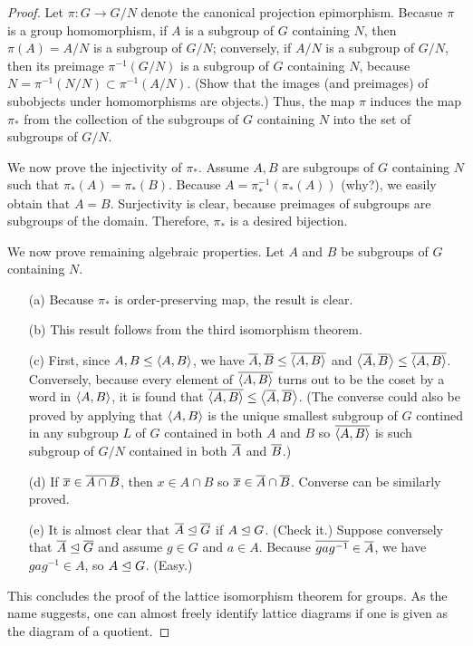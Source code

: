 \begin{proof}
    Let $\pi: G\rightarrow G/N$ denote the canonical projection epimorphism.
    Becasue $\pi$ is a group homomorphism, if $A$ is a subgroup of $G$ containing $N$, then $\pi(A)=A/N$ is a subgroup of $G/N$; conversely, if $A/N$ is a subgroup of $G/N$, then its preimage $\pi^{-1}(G/N)$ is a subgroup of $G$ containing $N$, because $N=\pi^{-1}(N/N)\subset\pi^{-1}(A/N)$.
    \color{brown}(Show that the images (and preimages) of subobjects under homomorphisms are objects.) \color{black}
    Thus, the map $\pi$ induces the map $\pi_*$ from the collection of the subgroups of $G$ containing $N$ into the set of subgroups of $G/N$.
    
    We now prove the injectivity of $\pi_*$.
    Assume $A, B$ are subgroups of $G$ containing $N$ such that $\pi_*(A)=\pi_*(B)$.
    Because $A=\pi_*^{-1}(\pi_*(A))$ \color{brown}(why?)\color{black}, we easily obtain that $A=B$.
    Surjectivity is clear, because preimages of subgroups are subgroups of the domain.
    Therefore, $\pi_*$ is a desired bijection.

    We now prove remaining algebraic properties.
    Let $A$ and $B$ be subgroups of $G$ containing $N$.
    \begin{enumerate}
        \item[(a)]
        {
            Because $\pi_*$ is order-preserving map, the result is clear.
        }
        \item[(b)]
        {
            This result follows from the third isomorphism theorem.
        }
        \item[(c)]
        {
            First, since $A, B\leq{\left\langle{A, B}\right\rangle}$, we have $\overline{A}, \overline{B}\leq\overline{{\left\langle{A, B}\right\rangle}}$ and ${\left\langle{\overline{A}, \overline{B}}\right\rangle}\leq\overline{{\left\langle{A, B}\right\rangle}}$.
            Conversely, because every element of $\overline{{\left\langle{A, B}\right\rangle}}$ turns out to be the coset by a word in ${\left\langle{A, B}\right\rangle}$, it is found that $\overline{{\left\langle{A, B}\right\rangle}}\leq{\left\langle{\overline{A}, \overline{B}}\right\rangle}$. (The converse could also be proved by applying that ${\left\langle{A, B}\right\rangle}$ is the unique smallest subgroup of $G$ contined in any subgroup $L$ of $G$ contained in both $A$ and $B$ so $\overline{{\left\langle{A, B}\right\rangle}}$ is such subgroup of $G/N$ contained in both $\overline{A}$ and $\overline{B}$.)
        }
        \item[(d)]
        {
            If $\overline{x}\in\overline{A\cap B}$, then $x\in A\cap B$ so $\overline{x}\in\overline{A}\cap \overline{B}$.
            Converse can be similarly proved.
        }
        \item[(e)]
        {
            It is almost clear that $\overline{A}\trianglelefteq \overline{G}$ if $A\trianglelefteq G$. \color{brown}(Check it.) \color{black}
            Suppose conversely that $\overline{A}\trianglelefteq \overline{G}$ and assume $g\in G$ and $a\in A$.
            Because $\overline{gag^{-1}}\in \overline{A}$, we have $gag^{-1}\in A$, so $A\trianglelefteq G$. (Easy.)
        }
    \end{enumerate}

    This concludes the proof of the lattice isomorphism theorem for groups.
    As the name suggests, one can almost freely identify lattice diagrams if one is given as the diagram of a quotient.
\end{proof}